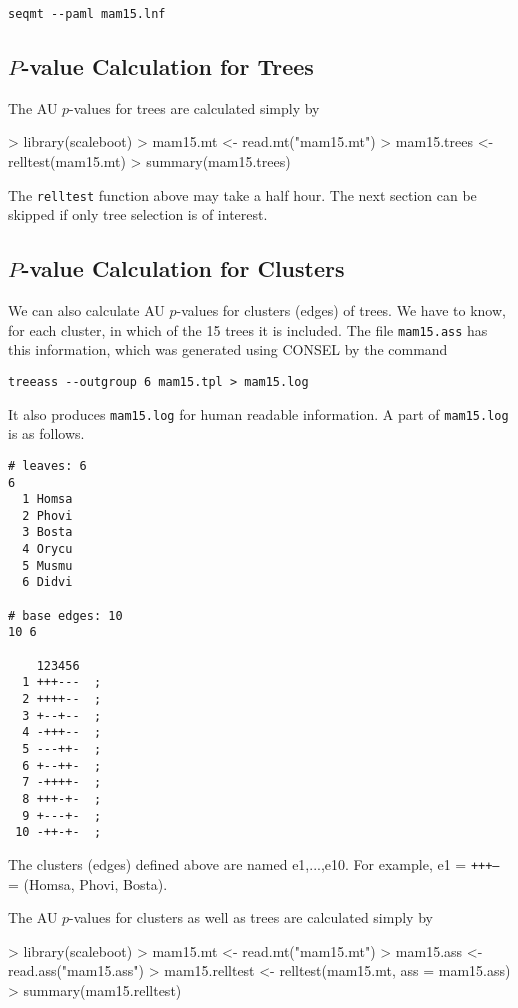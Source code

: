 \documentclass[a4paper]{amsart}
\begin{document}
\verb!seqmt --paml mam15.lnf!


\subsection{$P$-value Calculation for Trees}

The AU $p$-values for trees are calculated simply by
\begin{Schunk}
\begin{Sinput}
> library(scaleboot)
> mam15.mt <- read.mt("mam15.mt")
> mam15.trees <- relltest(mam15.mt)
> summary(mam15.trees)
\end{Sinput}
\end{Schunk}
The {\tt relltest} function above may take a half hour. The next
section can be skipped if only tree selection is of interest.

\subsection{$P$-value Calculation for Clusters}

We can also calculate AU $p$-values for clusters (edges) of trees.  We
have to know, for each cluster, in which of the 15 trees it is
included.  The file {\tt mam15.ass} has this information, which was
generated using CONSEL by the command 

\verb!treeass --outgroup 6 mam15.tpl > mam15.log!

It also produces {\tt mam15.log} for human readable information.  A
part of {\tt mam15.log} is as follows.
\begin{verbatim}
# leaves: 6
6
  1 Homsa
  2 Phovi
  3 Bosta
  4 Orycu
  5 Musmu
  6 Didvi

# base edges: 10
10 6
          
    123456
  1 +++---  ;
  2 ++++--  ;
  3 +--+--  ;
  4 -+++--  ;
  5 ---++-  ;
  6 +--++-  ;
  7 -++++-  ;
  8 +++-+-  ;
  9 +---+-  ;
 10 -++-+-  ;
\end{verbatim}
The clusters (edges) defined above are named e1,...,e10. For example,
e1 = {\tt +++---} = (Homsa, Phovi, Bosta).

The AU $p$-values for clusters as well as trees are calculated simply by
\begin{Schunk}
\begin{Sinput}
> library(scaleboot)
> mam15.mt <- read.mt("mam15.mt")
> mam15.ass <- read.ass("mam15.ass")
> mam15.relltest <- relltest(mam15.mt, ass = mam15.ass)
> summary(mam15.relltest)
\end{Sinput}
\end{Schunk}
\end{document}
